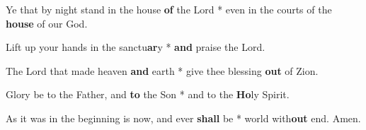 \begin{multicols}{2}
	Ye that by night stand in the house \textbf{of} the Lord * even in the courts of the \textbf{house} of our God.
	
	Lift up your hands in the sanctu\textbf{ar}y * \textbf{and} praise the Lord.
	
	The Lord that made heaven \textbf{and} earth * give thee blessing \textbf{out} of Zion.
	
	Glory be to the Father, and \textbf{to} the Son * and to the \textbf{Ho}ly Spirit.
	
	As it was in the beginning is now, and ever \textbf{shall} be * world with\textbf{out} end. Amen.
\end{multicols}